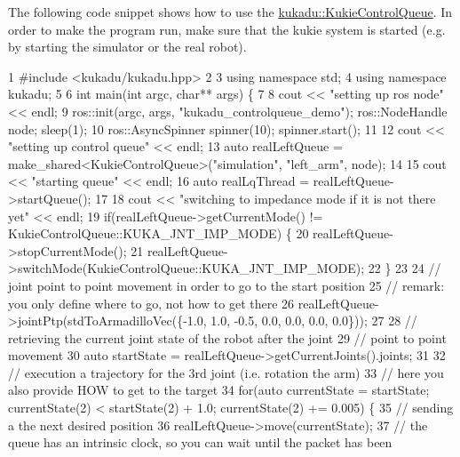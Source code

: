 The following code snippet shows how to use the \hyperlink{classkukadu_1_1KukieControlQueue}{kukadu\-::\-Kukie\-Control\-Queue}. In order to make the program run, make sure that the kukie system is started (e.\-g. by starting the simulator or the real robot). 
\begin{DoxyCodeInclude}
1 \textcolor{preprocessor}{#include <kukadu/kukadu.hpp>}
2 
3 \textcolor{keyword}{using namespace }std;
4 \textcolor{keyword}{using namespace }kukadu;
5 
6 \textcolor{keywordtype}{int} main(\textcolor{keywordtype}{int} argc, \textcolor{keywordtype}{char}** args) \{
7 
8     cout << \textcolor{stringliteral}{"setting up ros node"} << endl;
9     ros::init(argc, args, \textcolor{stringliteral}{"kukadu\_controlqueue\_demo"}); ros::NodeHandle node; sleep(1);
10     ros::AsyncSpinner spinner(10); spinner.start();
11 
12     cout << \textcolor{stringliteral}{"setting up control queue"} << endl;
13     \textcolor{keyword}{auto} realLeftQueue = make\_shared<KukieControlQueue>(\textcolor{stringliteral}{"simulation"}, \textcolor{stringliteral}{"left\_arm"}, node);
14 
15     cout << \textcolor{stringliteral}{"starting queue"} << endl;
16     \textcolor{keyword}{auto} realLqThread = realLeftQueue->startQueue();
17 
18     cout << \textcolor{stringliteral}{"switching to impedance mode if it is not there yet"} << endl;
19     \textcolor{keywordflow}{if}(realLeftQueue->getCurrentMode() != KukieControlQueue::KUKA\_JNT\_IMP\_MODE) \{
20         realLeftQueue->stopCurrentMode();
21         realLeftQueue->switchMode(KukieControlQueue::KUKA\_JNT\_IMP\_MODE);
22     \}
23 
24     \textcolor{comment}{// joint point to point movement in order to go to the start position}
25     \textcolor{comment}{// remark: you only define where to go, not how to get there}
26     realLeftQueue->jointPtp(stdToArmadilloVec(\{-1.0, 1.0, -0.5, 0.0, 0.0, 0.0, 0.0\}));
27 
28     \textcolor{comment}{// retrieving the current joint state of the robot after the joint}
29     \textcolor{comment}{// point to point movement}
30     \textcolor{keyword}{auto} startState = realLeftQueue->getCurrentJoints().joints;
31 
32     \textcolor{comment}{// execution a trajectory for the 3rd joint (i.e. rotation the arm)}
33     \textcolor{comment}{// here you also provide HOW to get to the target}
34     \textcolor{keywordflow}{for}(\textcolor{keyword}{auto} currentState = startState; currentState(2) < startState(2) + 1.0; currentState(2) += 0.005) \{
35         \textcolor{comment}{// sending a the next desired position}
36         realLeftQueue->move(currentState);
37         \textcolor{comment}{// the queue has an intrinsic clock, so you can wait until the packet has been}

\end{DoxyCodeInclude}
